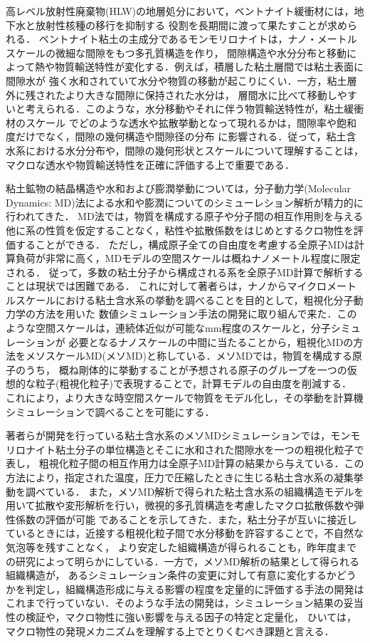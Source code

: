 高レベル放射性廃棄物(HLW)の地層処分において，ベントナイト緩衝材には，地下水と放射性核種の移行を抑制する
役割を長期間に渡って果たすことが求められる．
ベントナイト粘土の主成分であるモンモリロナイトは，ナノ・メートルスケールの微細な間隙をもつ多孔質構造を作り，
間隙構造や水分分布と移動によって熱や物質輸送特性が変化する．例えば，積層した粘土層間では粘土表面に間隙水が
強く水和されていて水分や物質の移動が起こりにくい．一方，粘土層外に残されたより大きな間隙に保持された水分は，
層間水に比べて移動しやすいと考えられる．このような，水分移動やそれに伴う物質輸送特性が，粘土緩衝材のスケール
でどのような透水や拡散挙動となって現れるかは，間隙率や飽和度だけでなく，間隙の幾何構造や間隙径の分布
に影響される．従って，粘土含水系における水分分布や，間隙の幾何形状とスケールについて理解することは，
マクロな透水や物質輸送特性を正確に評価する上で重要である．

粘土鉱物の結晶構造や水和および膨潤挙動については，分子動力学(Molecular Dynamics: MD)法による水和や膨潤についてのシミューレション解析が精力的に行われてきた．
MD法では，物質を構成する原子や分子間の相互作用則を与える他に系の性質を仮定することなく，粘性や拡散係数をはじめとするクロ物性を評価することができる．
ただし，構成原子全ての自由度を考慮する全原子MDは計算負荷が非常に高く，MDモデルの空間スケールは概ねナノメートル程度に限定される．
従って，多数の粘土分子から構成される系を全原子MD計算で解析することは現状では困難である．
これに対して著者らは，ナノからマイクロメートルスケールにおける粘土含水系の挙動を調べることを目的として，粗視化分子動力学の方法を用いた
数値シミュレーション手法の開発に取り組んで来た．このような空間スケールは，連続体近似が可能なmm程度のスケールと，分子シミュレーションが
必要となるナノスケールの中間に当たることから，粗視化MDの方法をメソスケールMD(メソMD)と称している．メソMDでは，物質を構成する原子のうち，
概ね剛体的に挙動することが予想される原子のグループを一つの仮想的な粒子(粗視化粒子)で表現することで，計算モデルの自由度を削減する．
これにより，より大きな時空間スケールで物質をモデル化し，その挙動を計算機シミュレーションで調べることを可能にする．

著者らが開発を行っている粘土含水系のメソMDシミュレーションでは，モンモリロナイト粘土分子の単位構造とそこに水和された間隙水を一つの粗視化粒子で表し，
粗視化粒子間の相互作用力は全原子MD計算の結果から与えている．この方法により，指定された温度，圧力で圧縮したときに生じる粘土含水系の凝集挙動を調べている．
また，メソMD解析で得られた粘土含水系の組織構造モデルを用いて拡散や変形解析を行い，微視的多孔質構造を考慮したマクロ拡散係数や弾性係数の評価が可能
であることを示してきた．また，粘土分子が互いに接近しているときには，近接する粗視化粒子間で水分移動を許容することで，不自然な気泡等を残すことなく，
より安定した組織構造が得られることも，昨年度までの研究によって明らかにしている．一方で，メソMD解析の結果として得られる組織構造が，
あるシミュレーション条件の変更に対して有意に変化するかどうかを判定し，組織構造形成に与える影響の程度を定量的に評価する手法の開発は
これまで行っていない．そのような手法の開発は，シミュレーション結果の妥当性の検証や，マクロ物性に強い影響を与える因子の特定と定量化，
ひいては，マクロ物性の発現メカニズムを理解する上でとりくむべき課題と言える．

